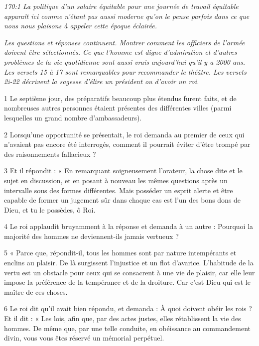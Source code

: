 \par \textit{170:1 La politique d'un salaire équitable pour une journée de travail équitable apparaît ici comme n'étant pas aussi moderne qu'on le pense parfois dans ce que nous nous plaisons à appeler cette époque éclairée.}


\par \textit{Les questions et réponses continuent. Montrer comment les officiers de l'armée doivent être sélectionnés. Ce que l'homme est digne d'admiration et d'autres problèmes de la vie quotidienne sont aussi vrais aujourd'hui qu'il y a 2000 ans. Les versets 15 à 17 sont remarquables pour recommander le théâtre. Les versets 2i-22 décrivent la sagesse d'élire un président ou d'avoir un roi.}

\par 1 Le septième jour, des préparatifs beaucoup plus étendus furent faits, et de nombreuses autres personnes étaient présentes des différentes villes (parmi lesquelles un grand nombre d'ambassadeurs).

\par 2 Lorsqu'une opportunité se présentait, le roi demanda au premier de ceux qui n'avaient pas encore été interrogés, comment il pourrait éviter d'être trompé par des raisonnements fallacieux ?

\par 3 Et il répondit : « En remarquant soigneusement l'orateur, la chose dite et le sujet en discussion, et en posant à nouveau les mêmes questions après un intervalle sous des formes différentes. Mais posséder un esprit alerte et être capable de former un jugement sûr dans chaque cas est l'un des bons dons de Dieu, et tu le possèdes, ô Roi.

\par 4 Le roi applaudit bruyamment à la réponse et demanda à un autre : Pourquoi la majorité des hommes ne deviennent-ils jamais vertueux ?

\par 5 « Parce que, répondit-il, tous les hommes sont par nature intempérants et enclins au plaisir. De là surgissent l’injustice et un flot d’avarice. L'habitude de la vertu est un obstacle pour ceux qui se consacrent à une vie de plaisir, car elle leur impose la préférence de la tempérance et de la droiture. Car c'est Dieu qui est le maître de ces choses.

\par 6 Le roi dit qu'il avait bien répondu, et demanda : À quoi doivent obéir les rois ? Et il dit : « Les lois, afin que, par des actes justes, elles rétablissent la vie des hommes. De même que, par une telle conduite, en obéissance au commandement divin, vous vous êtes réservé un mémorial perpétuel.

